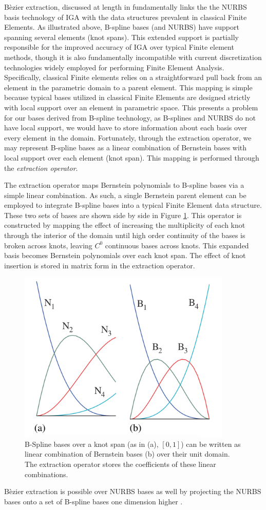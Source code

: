 \documentclass[./FinalReport.tex]{subfiles}
\begin{document}
B\`{e}zier extraction, discussed at length in \cite{borden_isogeometric_2011} fundamentally links the the NURBS basis technology of IGA with the data structures prevalent in classical Finite Elements. As illustrated above, B-spline bases (and NURBS) have support spanning several elements (knot spans). This extended support is partially responsible for the improved accuracy of IGA over typical Finite element methods, though it is also fundamentally incompatible with current discretization technologies widely employed for performing Finite Element Analysis. Specifically, classical Finite elements relies on a straightforward pull back from an element in the parametric domain to a parent element. This mapping is simple because typical bases utilized in classical Finite Elements are designed strictly with local support over an element in parametric space. This presents a problem for our bases derived from B-spline technology, as B-splines and NURBS do not have local support, we would have to store information about each basis over every element in the domain. Fortunately, through the extraction operator, we may represent B-spline bases as a linear combination of Bernstein bases with local support over each element (knot span). This mapping is performed through the \textit{extraction operator}. 

The extraction operator maps Bernstein polynomials to B-spline bases via a simple linear combination.  As such, a single Bernstein parent element can be employed to integrate B-spline bases into a typical Finite Element data structure. These two sets of bases are shown side by side in Figure \ref{fig:extracted}. This operator is constructed by mapping the effect of increasing the multiplicity of each knot through the interior of the domain until high order continuity of the bases is broken across knots, leaving $C^0$ continuous bases across knots. This expanded basis becomes Bernstein polynomials over each knot span. The effect of knot insertion is stored in matrix form in the extraction operator. 

\begin{figure}
  \centerline{\includegraphics[width=4in]{./figures/Extracted_B-Spline}}
  \caption{\cite{borden_isogeometric_2011} B-Spline bases over a knot span (as in (a), $[0,1]$) can be written as linear combination of Bernstein bases (b) over their unit domain. The extraction operator stores the coefficients of these linear combinations.}
  \label{fig:extracted}
\end{figure}

B\`ezier extraction is possible over NURBS bases as well by projecting the NURBS bases onto a set of B-spline bases one dimension higher \cite{piegl_nurbs_2012}. 
\end{document}
